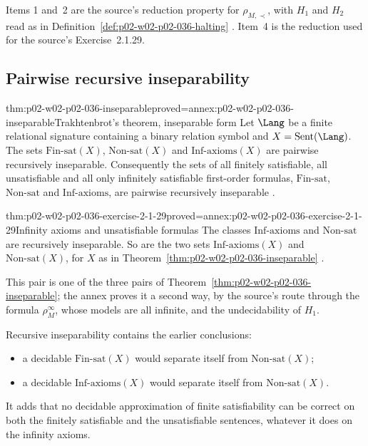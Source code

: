 Items 1 and~2 are the source's reduction property for \(\rho_{M,\prec}\), with
\(H_1\) and \(H_2\) read as in
Definition~\ref{def:p02-w02-p02-036-halting}
\cite[Sect.~2.1.2, p.~34]{BorgerGradelGurevich1997}.  Item~4 is the reduction
used for the source's Exercise~2.1.29.

\subsection{Pairwise recursive inseparability}
\label{sec:p02-w02-p02-036-trakhtenbrot-inseparable}

\begin{hbtheorem}{thm:p02-w02-p02-036-inseparable}{proved=annex:p02-w02-p02-036-inseparable}{Trakhtenbrot's theorem, inseparable form}
Let \(\Lang\) be a finite relational signature containing a binary relation
symbol and \(X=\operatorname{Sent}(\Lang)\).  The sets
\(\mathrm{Fin\text{-}sat}(X)\), \(\mathrm{Non\text{-}sat}(X)\) and
\(\mathrm{Inf\text{-}axioms}(X)\) are pairwise recursively inseparable.
Consequently the sets of all finitely satisfiable, all unsatisfiable and all
only infinitely satisfiable first-order formulas, \(\mathrm{Fin\text{-}sat}\),
\(\mathrm{Non\text{-}sat}\) and \(\mathrm{Inf\text{-}axioms}\), are pairwise
recursively inseparable \cite[Sect.~2.1.2, Thm.~2.1.30]{BorgerGradelGurevich1997}.
\end{hbtheorem}

\begin{hbcorollary}{thm:p02-w02-p02-036-exercise-2-1-29}{proved=annex:p02-w02-p02-036-exercise-2-1-29}{Infinity axioms and unsatisfiable formulas}
The classes \(\mathrm{Inf\text{-}axioms}\) and \(\mathrm{Non\text{-}sat}\) are
recursively inseparable.  So are the two sets
\(\mathrm{Inf\text{-}axioms}(X)\) and \(\mathrm{Non\text{-}sat}(X)\), for \(X\)
as in
Theorem~\ref{thm:p02-w02-p02-036-inseparable}
\cite[Sect.~2.1.2, Exercise~2.1.29]{BorgerGradelGurevich1997}.
\end{hbcorollary}

This pair is one of the three pairs of
Theorem~\ref{thm:p02-w02-p02-036-inseparable}; the annex proves it a second way,
by the source's route through the formula \(\rho^{\infty}_{M}\), whose models
are all infinite, and the undecidability of \(H_1\).

Recursive inseparability contains the earlier conclusions:
\begin{itemize}
\item a decidable \(\mathrm{Fin\text{-}sat}(X)\) would separate itself from
      \(\mathrm{Non\text{-}sat}(X)\);
\item a decidable \(\mathrm{Inf\text{-}axioms}(X)\) would separate itself from
      \(\mathrm{Non\text{-}sat}(X)\).
\end{itemize}
It adds that no decidable approximation of finite satisfiability can be correct on
both the finitely satisfiable and the unsatisfiable sentences, whatever it
does on the infinity axioms.

